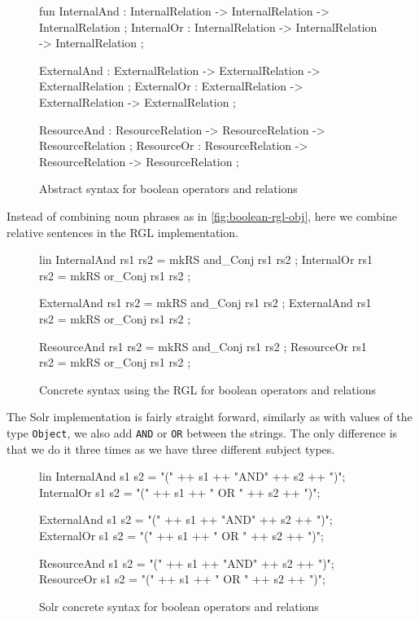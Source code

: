 \begin{figure}[H]
\begin{code}
fun
  InternalAnd : InternalRelation -> InternalRelation -> InternalRelation ;
  InternalOr : InternalRelation -> InternalRelation -> InternalRelation ;

  ExternalAnd : ExternalRelation -> ExternalRelation -> ExternalRelation ;
  ExternalOr : ExternalRelation -> ExternalRelation -> ExternalRelation ;
 	  
  ResourceAnd : ResourceRelation -> ResourceRelation -> ResourceRelation ;
  ResourceOr : ResourceRelation -> ResourceRelation -> ResourceRelation ;
\end{code}
\caption{Abstract syntax for boolean operators and relations\label{fig:boolean-abstract-relations}}
\end{figure}

Instead of combining noun phrases as in \autoref{fig:boolean-rgl-obj}, here we combine relative sentences in the RGL implementation.

\begin{figure}[H]
\begin{code}
lin
  InternalAnd rs1 rs2 = mkRS and_Conj rs1 rs2 ;
  InternalOr rs1 rs2 = mkRS or_Conj rs1 rs2 ;
	  
  ExternalAnd rs1 rs2 = mkRS and_Conj rs1 rs2 ;
  ExternalAnd rs1 rs2 = mkRS or_Conj rs1 rs2 ;
	  
  ResourceAnd rs1 rs2 = mkRS and_Conj rs1 rs2 ;
  ResourceOr rs1 rs2 = mkRS or_Conj rs1 rs2 ;
\end{code}
\caption{Concrete syntax using the RGL for boolean operators and relations\label{fig:boolean-rgl-relations}}
\end{figure}

The Solr implementation is fairly straight forward, similarly as with values of the type \texttt{Object}, we also add \texttt{AND} or \texttt{OR} between the strings. The only difference is that we do it three times as we have three different subject types.

\begin{figure}[H]
\begin{code}
lin
  InternalAnd s1 s2 = "(" ++ s1 ++ "AND" ++ s2 ++ ")";
  InternalOr s1 s2 = "(" ++ s1 ++ " OR " ++ s2 ++ ")";

  ExternalAnd s1 s2 = "(" ++ s1 ++ "AND" ++ s2 ++ ")";
  ExternalOr s1 s2 = "(" ++ s1 ++ " OR " ++ s2 ++ ")";

  ResourceAnd s1 s2 = "(" ++ s1 ++ "AND" ++ s2 ++ ")";
  ResourceOr s1 s2 = "(" ++ s1 ++ " OR " ++ s2 ++ ")";
\end{code}
\caption{Solr concrete syntax for boolean operators and relations\label{fig:boolean-solr-relations}}
\end{figure}

